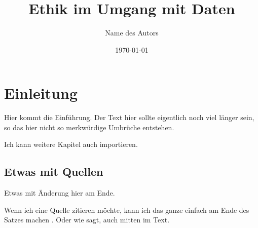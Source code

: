 \documentclass{report}
\title{Ethik im Umgang mit Daten}
\author{Name des Autors}
\date{\today}
\begin{document}
\maketitle


\tableofcontents

\chapter{Einleitung}

Hier kommt die Einführung. Der Text hier sollte eigentlich noch viel länger sein, so das hier nicht so merkwürdige Umbrüche entstehen.

Ich kann weitere Kapitel auch importieren.



\section{Etwas mit Quellen}

Etwas mit Änderung hier am Ende.

Wenn ich eine Quelle zitieren möchte, kann ich das ganze einfach am Ende des Satzes machen \citep{example}. Oder wie \citet{example} sagt, auch mitten im Text.

\printbibliography
\end{document}

